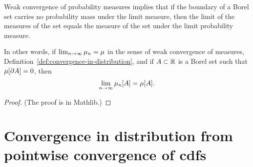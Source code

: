 \begin{lemma}
  \label{lem:portmanteau-convergence-for-borel}
  \leanok
  \mathlibok
  Weak convergence of probability measures implies that if the boundary of a Borel set carries
  no probability mass under the limit measure, then the limit of the measures of the set equals
  the measure of the set under the limit probability measure.

  In other words, if $\lim_{n \to \infty} \mu_n = \mu$ in the sense of weak convergence
  of measures, Definition~\ref{def:convergence-in-distribution}, and if $A \subset \mathbb{R}$
  is a Borel set such that $\mu[\partial A] = 0$, then
  \begin{align*}
    \lim_{n \to \infty} \mu_n [ A ] = \mu [ A ] .
  \end{align*}
\end{lemma}
\begin{proof}
  \leanok
  \mathlibok
  (The proof is in Mathlib.)
\end{proof}

\section{Convergence in distribution from pointwise convergence of cdfs}

